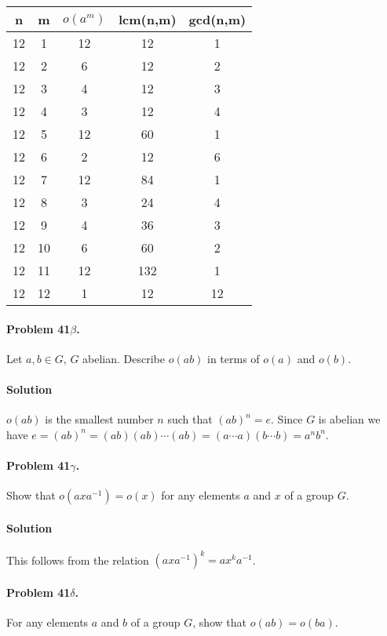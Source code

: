 \begin{center}
\begin{tabular}{|c|c|c|c|c|}
\hline
n & m & $o(a^m)$ & lcm(n,m) & gcd(n,m) \\
\hline
12 & 1 & 12 & 12 & 1\\
12 & 2 & 6 & 12 & 2 \\
12 & 3 & 4 & 12 & 3 \\
12 & 4 & 3 & 12 & 4 \\
12 & 5 & 12 & 60 & 1 \\
12 & 6 & 2 & 12 & 6 \\
12 & 7 & 12 & 84 & 1 \\
12 & 8 & 3 & 24 & 4 \\
12 & 9 & 4 & 36 & 3 \\
12 & 10 & 6 & 60 & 2 \\
12 & 11 & 12 & 132 & 1 \\
12 & 12 & 1 & 12 & 12 \\
\hline
\end{tabular}
\end{center}

\paragraph{Problem 41$\beta$.}
Let $a, b \in G$, $G$ abelian. Describe $o(ab)$ in terms of $o(a)$ and $o(b)$.

\paragraph*{Solution}
$o(ab)$ is the smallest number $n$ such that $(ab)^n=e$. Since $G$ is abelian
we have $e=(ab)^n=(ab)(ab)\cdots(ab)=(a\cdots a)(b\cdots b)=a^n b^n$.

\paragraph{Problem 41$\gamma$.}
Show that $o(axa^{-1}) = o(x)$ for any elements $a$ and $x$ of a group $G$.

\paragraph*{Solution}
This follows from the relation $(axa^{-1})^k = ax^k a^{-1}$.

\paragraph{Problem 41$\delta$.}
For any elements $a$ and $b$ of a group $G$, show that $o(ab) = o(ba)$.

